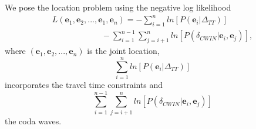 \documentclass[extra]{gji}
\begin{document}
We pose the location problem using the negative log likelihood
\begin{equation}
\label{eq-Lstar-tt-cwi}
\begin{array}{l}
 L(\mathbf{e}_1, \mathbf{e}_2, ...,
\mathbf{e}_1, \mathbf{e}_n) = - \sum_{i=1}^n
ln\left[P(\mathbf{e}_i|\Delta_{TT})\right] \\
\hspace{6em}  - \sum_{i=1}^{n-1}
\sum_{j=i+1}^n
ln\left[P(\delta_{CWIN}|\mathbf{e}_i,\mathbf{e}_j)\right],
\end{array}
\end{equation}
where $(\mathbf{e}_1, \mathbf{e}_2, ..., \mathbf{e}_n)$ is the joint
location,
\begin{equation}
\label{eq-ttcomponent} \sum_{i=1}^n
ln\left[P(\mathbf{e}_i|\Delta_{TT})\right]
\end{equation}
incorporates the travel time constraints and
\begin{equation}
\label{eq-codacomponent} \sum_{i=1}^{n-1} \sum_{j=i+1}^n
ln\left[P(\delta_{CWIN}|\mathbf{e}_i,\mathbf{e}_j)\right]
\end{equation}
 the coda waves.
\end{document}
